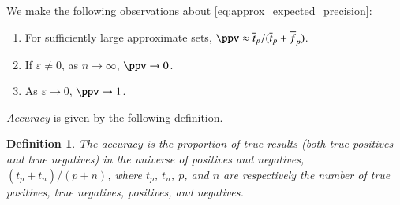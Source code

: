 \documentclass[10pt,final,hidelinks]{article}
\numberwithin{equation}{section}
\newcommand{\p}{p}
\newcommand{\n}{n}
\newcommand{\fprate}{\varepsilon}
\newcommand{\envnumstyle}{chapter}
\renewcommand{\envnumstyle}{chapter}
\renewcommand{\envnumstyle}{section}
\theoremstyle{plain}
\newtheorem{definition}{Definition}[\envnumstyle]
\begin{document}
We make the following observations about \cref{eq:approx_expected_precision}:
\begin{enumerate}
	\item For sufficiently large approximate sets, $\ppv \approx 
	\overline{t}_\p / (\overline{t}_\p + \overline{f}_\p)$.
	\item If $\fprate \neq 0$, as $\n \to \infty$, $\ppv \to 0$.
	\item As $\fprate \to 0$, $\ppv \to 1$.
\end{enumerate}

\emph{Accuracy} is given by the following definition.
\begin{definition}
	The \emph{accuracy} is the proportion of true results (both \emph{true 
		positives} and \emph{true negatives}) in the universe of positives and 
	negatives, $(t_p + t_n)/(\p + \n)$, where $t_p$, $t_n$, $\p$, and $\n$ are 
	respectively the number of \emph{true positives}, \emph{true negatives}, 
	\emph{positives}, and \emph{negatives}.
\end{definition}
\end{document}
